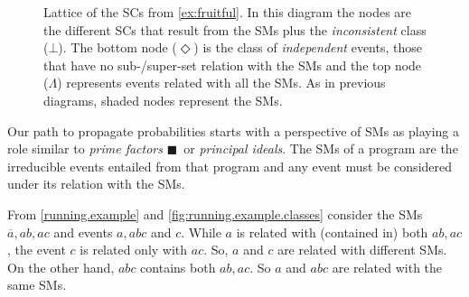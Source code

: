 \documentclass[a4paper]{article}
\newcommand{\co}[1]{\ensuremath{\overline{#1}}}     %
\newcommand{\inconsistent}{\bot}
\newcommand{\bottomclass}{\ensuremath{\Lambda}}
\newcommand{\indepclass}{\ensuremath{\Diamond}}
\newcommand{\LOOK}{\ensuremath{\blacksquare}}
\newcommand{\franc}[1]{{\color{green!30!black}#1}}
\begin{document}
%
%
\begin{figure}[t]
  \begin{center}
  \end{center}

  \caption{%
    Lattice of the \aclp{SC} from \cref{ex:fruitful}.  In this diagram
    the nodes are the different \aclp{SC} that result from the
    \aclp{SM} plus the \emph{inconsistent} class (\(\inconsistent\)).
    The bottom node (\(\indepclass\)) is the class of
    \emph{independent} events, those that have no sub-/super-set
    relation with the \acp{SM} and the top node (\(\bottomclass\))
    represents events related with all the \acp{SM}.  As in previous
    diagrams, shaded nodes represent the \acp{SM}.}
  \label{fig:fruitful.lattice}
\end{figure}

Our path to propagate probabilities starts with a perspective of
\aclp{SM} as playing a role similar to \emph{prime factors}
\franc{\LOOK~or \emph{principal ideals}}.  The \aclp{SM} of a program
are the irreducible events entailed from that program and any event
must be considered under its relation with the \aclp{SM}.

From \cref{running.example} and \cref{fig:running.example.classes}
consider the \aclp{SM} \(\co{a}, ab, ac\) and events \(a, abc\) and
\(c\).  While \(a\) is related with (contained in) both \(ab, ac\),
the event \(c\) is related only with \(ac\).  So, \(a\) and \(c\) are
related with different \aclp{SM}.  On the other hand, \(abc\) contains
both \(ab, ac\).  So \(a\) and \(abc\) are related with the same
\aclp{SM}.
\end{document}

